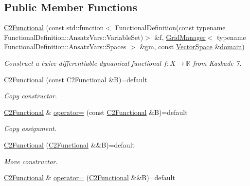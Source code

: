 \subsection*{Public Member Functions}
\begin{DoxyCompactItemize}
\item 
\hyperlink{classSpacy_1_1KaskadeParabolic_1_1C2Functional_a5404e3e95935488e457ed4b9dadb654c}{C2\-Functional} (const std\-::function$<$ Functional\-Definition(const typename Functional\-Definition\-::\-Ansatz\-Vars\-::\-Variable\-Set)$>$ \&f, \hyperlink{classSpacy_1_1KaskadeParabolic_1_1GridManager}{Grid\-Manager}$<$ typename Functional\-Definition\-::\-Ansatz\-Vars\-::\-Spaces $>$ \&gm, const \hyperlink{classSpacy_1_1VectorSpace}{Vector\-Space} \&\hyperlink{classSpacy_1_1FunctionalBase_a2d3397deb9fa1ad85ed04e37a03b3aa6}{domain})
\begin{DoxyCompactList}\small\item\em Construct a twice differentiable dynamical functional $f: X\rightarrow \mathbb{R}$ from Kaskade 7. \end{DoxyCompactList}\item 
\hyperlink{classSpacy_1_1KaskadeParabolic_1_1C2Functional_a8c31f6d9a66d87a1187616edc542b416}{C2\-Functional} (const \hyperlink{classSpacy_1_1KaskadeParabolic_1_1C2Functional}{C2\-Functional} \&B)=default
\begin{DoxyCompactList}\small\item\em Copy constructor. \end{DoxyCompactList}\item 
\hyperlink{classSpacy_1_1KaskadeParabolic_1_1C2Functional}{C2\-Functional} \& \hyperlink{classSpacy_1_1KaskadeParabolic_1_1C2Functional_aeb56e3eef66f1eab018badd769e7e47d}{operator=} (const \hyperlink{classSpacy_1_1KaskadeParabolic_1_1C2Functional}{C2\-Functional} \&B)=default
\begin{DoxyCompactList}\small\item\em Copy assignment. \end{DoxyCompactList}\item 
\hyperlink{classSpacy_1_1KaskadeParabolic_1_1C2Functional_a4a324d1d9c1cf00fedf60abbb233bd29}{C2\-Functional} (\hyperlink{classSpacy_1_1KaskadeParabolic_1_1C2Functional}{C2\-Functional} \&\&B)=default
\begin{DoxyCompactList}\small\item\em Move constructor. \end{DoxyCompactList}\item 
\hyperlink{classSpacy_1_1KaskadeParabolic_1_1C2Functional}{C2\-Functional} \& \hyperlink{classSpacy_1_1KaskadeParabolic_1_1C2Functional_a2e73f22db4454cb457f3ffb911b92a41}{operator=} (\hyperlink{classSpacy_1_1KaskadeParabolic_1_1C2Functional}{C2\-Functional} \&\&B)=default

\end{DoxyCompactItemize}
